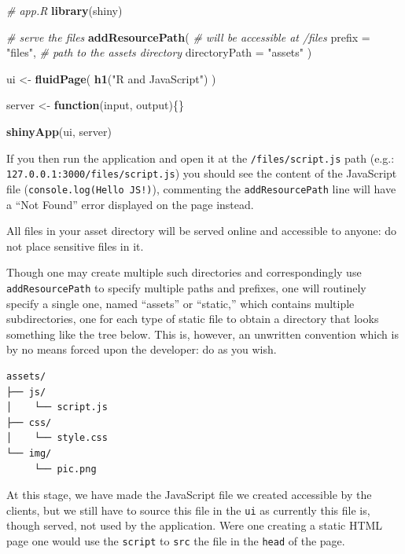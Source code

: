 \documentclass[
]{krantz}
\makeatletter
\newenvironment{Shaded}{\begin{snugshade}}{\end{snugshade}}
\newcommand{\CommentTok}[1]{\textcolor[rgb]{0.37,0.37,0.37}{\textit{#1}}}
\newcommand{\ControlFlowTok}[1]{\textcolor[rgb]{0.27,0.27,0.27}{\textbf{#1}}}
\newcommand{\DataTypeTok}[1]{\textcolor[rgb]{0.27,0.27,0.27}{#1}}
\newcommand{\KeywordTok}[1]{\textcolor[rgb]{0.27,0.27,0.27}{\textbf{#1}}}
\newcommand{\NormalTok}[1]{#1}
\newcommand{\StringTok}[1]{\textcolor[rgb]{0.5,0.5,0.5}{#1}}
\newenvironment{kframe}{%
\medskip{}
\setlength{\fboxsep}{.8em}
 \def\at@end@of@kframe{}%
 \ifinner\ifhmode%
  \def\at@end@of@kframe{\end{minipage}}%
  \begin{minipage}{\columnwidth}%
 \fi\fi%
 \def\FrameCommand##1{\hskip\@totalleftmargin \hskip-\fboxsep
 \colorbox{shadecolor}{##1}\hskip-\fboxsep
     \hskip-\linewidth \hskip-\@totalleftmargin \hskip\columnwidth}%
 \MakeFramed {\advance\hsize-\width
   \@totalleftmargin\z@ \linewidth\hsize
   \@setminipage}}%
 {\par\unskip\endMakeFramed%
 \at@end@of@kframe}
\renewenvironment{Shaded}{\begin{kframe}}{\end{kframe}}
\newenvironment{rmdblock}[1]
  {
  \begin{itemize}
  \renewcommand{\labelitemi}{
    \raisebox{-.7\height}[0pt][0pt]{
      {\setkeys{Gin}{width=3em,keepaspectratio}\texttt{[image: images/\#1]}}
    }
  }
  \setlength{\fboxsep}{1em}
  \begin{kframe}
  \item
  }
  {
  \end{kframe}
  \end{itemize}
  }
\newenvironment{rmdnote}
  {\begin{rmdblock}{note}}
  {\end{rmdblock}}
\makeatother
\begin{document}
\begin{Shaded}
\begin{Highlighting}[]
\CommentTok{\# app.R}
\KeywordTok{library}\NormalTok{(shiny)}

\CommentTok{\# serve the files}
\KeywordTok{addResourcePath}\NormalTok{(}
  \CommentTok{\# will be accessible at /files}
  \DataTypeTok{prefix =} \StringTok{"files"}\NormalTok{, }
  \CommentTok{\# path to the assets directory}
  \DataTypeTok{directoryPath =} \StringTok{"assets"}
\NormalTok{)}

\NormalTok{ui <{-}}\StringTok{ }\KeywordTok{fluidPage}\NormalTok{(}
  \KeywordTok{h1}\NormalTok{(}\StringTok{"R and JavaScript"}\NormalTok{)}
\NormalTok{)}

\NormalTok{server <{-}}\StringTok{ }\ControlFlowTok{function}\NormalTok{(input, output)\{\}}

\KeywordTok{shinyApp}\NormalTok{(ui, server)}
\end{Highlighting}
\end{Shaded}

If you then run the application and open it at the \texttt{/files/script.js} path (e.g.: \texttt{127.0.0.1:3000/files/script.js}) you should see the content of the JavaScript file (\texttt{console.log(\textquotesingle{}Hello\ JS!\textquotesingle{})}), commenting the \texttt{addResourcePath} line will have a ``Not Found'' error displayed on the page instead.

\begin{rmdnote}
All files in your asset directory will be served online and accessible
to anyone: do not place sensitive files in it.
\end{rmdnote}

Though one may create multiple such directories and correspondingly use \texttt{addResourcePath} to specify multiple paths and prefixes, one will routinely specify a single one, named ``assets'' or ``static,'' which contains multiple subdirectories, one for each type of static file to obtain a directory that looks something like the tree below. This is, however, an unwritten convention which is by no means forced upon the developer: do as you wish.

\begin{verbatim}
assets/
├── js/
│    └── script.js
├── css/
│    └── style.css
└── img/
     └── pic.png
\end{verbatim}

At this stage, we have made the JavaScript file we created accessible by the clients, but we still have to source this file in the \texttt{ui} as currently this file is, though served, not used by the application. Were one creating a static HTML page one would use the \texttt{script} to \texttt{src} the file in the \texttt{head} of the page.
\end{document}
